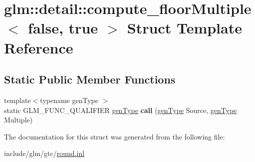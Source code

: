 \hypertarget{structglm_1_1detail_1_1compute__floorMultiple_3_01false_00_01true_01_4}{}\section{glm\+:\+:detail\+:\+:compute\+\_\+floor\+Multiple$<$ false, true $>$ Struct Template Reference}
\label{structglm_1_1detail_1_1compute__floorMultiple_3_01false_00_01true_01_4}
\subsection*{Static Public Member Functions}
\begin{DoxyCompactItemize}
\item 
\mbox{\label{structglm_1_1detail_1_1compute__floorMultiple_3_01false_00_01true_01_4_a1d2dfa9746c67e805de83b41b6a7a94d}} 
{\footnotesize template$<$typename gen\+Type $>$ }\\static G\+L\+M\+\_\+\+F\+U\+N\+C\+\_\+\+Q\+U\+A\+L\+I\+F\+I\+ER \hyperlink{structglm_1_1detail_1_1genType}{gen\+Type} {\bfseries call} (\hyperlink{structglm_1_1detail_1_1genType}{gen\+Type} Source, \hyperlink{structglm_1_1detail_1_1genType}{gen\+Type} Multiple)
\end{DoxyCompactItemize}


The documentation for this struct was generated from the following file\+:\begin{DoxyCompactItemize}
\item 
include/glm/gtc/\hyperlink{round_8inl}{round.\+inl}\end{DoxyCompactItemize}
